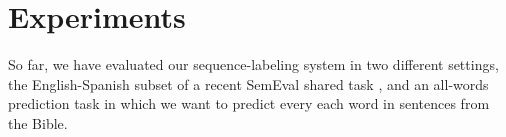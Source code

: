 \documentclass[11pt]{article}
\begin{document}

\section{Experiments}
So far, we have evaluated our sequence-labeling system in two different
settings, the English-Spanish subset of a recent SemEval shared task
\cite{task10}, and an all-words prediction task in which we want to predict
every each word in sentences from the Bible.
\end{document}
